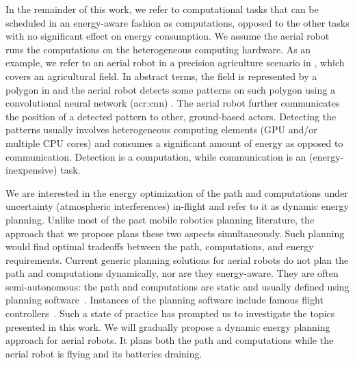 In the remainder of this work, we refer to computational tasks that can be scheduled in an energy-aware fashion as computations, opposed to the other tasks with no significant effect on energy consumption. We assume the aerial robot runs the computations on the heterogeneous computing hardware. As an example, we refer to an aerial robot in a precision agriculture scenario in , which covers an agricultural field. 
%  
In abstract terms, the field is represented by a polygon in  and the aerial robot detects some patterns on such polygon using a convolutional neural network (\Gls{acr:cnn})%
. The aerial robot further communicates the position of a detected pattern to other, ground-based actors. Detecting the patterns usually involves heterogeneous computing elements (GPU and/or multiple CPU cores) and consumes a significant amount of energy as opposed to communication. Detection is a computation, while communication is an (energy-inexpensive) task.

We are interested in the energy optimization of the path and computations under uncertainty (atmospheric interferences) in-flight and refer to it as dynamic energy planning. Unlike most of the past mobile robotics planning literature, the approach that we propose plans these two aspects simultaneously. Such planning would find optimal tradeoffs between the path, computations, and energy requirements. Current generic planning solutions for aerial robots do not plan the path and computations dynamically, nor are they energy-aware. They are often semi-autonomous: the path and computations are static and usually defined using planning software~\citep{daponte2019review}. Instances of the planning software include famous flight controllers~\citep{px4,papa}. Such a state of practice has prompted us to investigate the topics presented in this work. We will gradually propose a dynamic energy planning approach for aerial robots. It plans both the path and computations while the aerial robot is flying and its batteries draining. 

